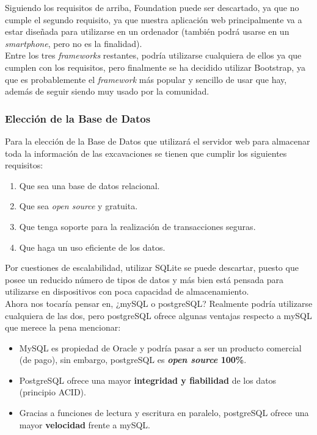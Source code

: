     Siguiendo los requisitos de arriba, Foundation puede ser descartado, ya que no cumple el
    segundo requisito, ya que nuestra aplicación web principalmente va a estar diseñada para
    utilizarse en un ordenador (también podrá usarse en un \textit{smartphone}, pero no es
    la finalidad).\\

    Entre los tres \textit{frameworks} restantes, podría utilizarse cualquiera de ellos ya
    que cumplen con los requisitos, pero finalmente se ha decidido utilizar Bootstrap, ya que
    es probablemente el \textit{framework} más popular y sencillo de usar que hay, además
    de seguir siendo muy usado por la comunidad. 
    

    \subsubsection{Elección de la Base de Datos}
    Para la elección de la Base de Datos que utilizará el servidor web para almacenar toda
    la información de las excavaciones se tienen que cumplir los siguientes requisitos:

        \begin{enumerate}
            \item Que sea una base de datos relacional.
            \item Que sea \textit{open source} y gratuita.
            \item Que tenga soporte para la realización de transacciones seguras.
            \item Que haga un uso eficiente de los datos.
        \end{enumerate}

    Por cuestiones de escalabilidad, utilizar SQLite se puede descartar, puesto que posee un
    reducido número de tipos de datos y más bien está pensada para utilizarse en dispositivos
    con poca capacidad de almacenamiento.\\

    Ahora nos tocaría pensar en, ¿mySQL o postgreSQL? Realmente podría utilizarse cualquiera
    de las dos, pero postgreSQL ofrece algunas ventajas respecto a mySQL que merece la pena
    mencionar: 
    
        \begin{itemize}
            \item MySQL es propiedad de Oracle y podría pasar a ser un producto comercial
            (de pago), sin embargo, postgreSQL es \textbf{\textit{open source} 100\%}.
            \item PostgreSQL ofrece una mayor \textbf{integridad y fiabilidad} de los datos
            (principio ACID).
            \item Gracias a funciones de lectura y escritura en paralelo, postgreSQL ofrece
            una mayor \textbf{velocidad} frente a mySQL.
        \end{itemize}
    

